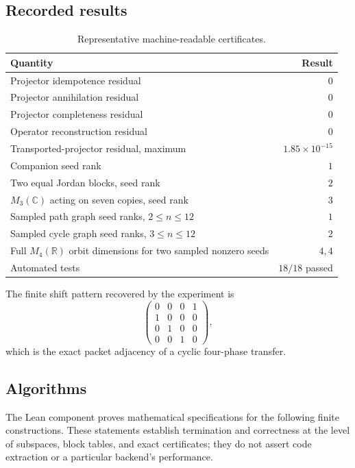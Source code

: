 \documentclass[11pt]{article}
\theoremstyle{definition}
\theoremstyle{remark}
\newcommand{\C}{\mathbb C}
\newcommand{\R}{\mathbb R}
\begin{document}
\subsection{Recorded results}

\begin{table}[htbp]
\centering
\caption{Representative machine-readable certificates.}
\label{tab:results}
\begin{tabular}{L{0.57\textwidth}r}
\toprule
Quantity & Result \\
\midrule
Projector idempotence residual & $0$ \\
Projector annihilation residual & $0$ \\
Projector completeness residual & $0$ \\
Operator reconstruction residual & $0$ \\
Transported-projector residual, maximum & $1.85\times10^{-15}$ \\
Companion seed rank & $1$ \\
Two equal Jordan blocks, seed rank & $2$ \\
$M_3(\C)$ acting on seven copies, seed rank & $3$ \\
Sampled path graph seed ranks, $2\le n\le12$ & $1$ \\
Sampled cycle graph seed ranks, $3\le n\le12$ & $2$ \\
Full $M_4(\R)$ orbit dimensions for two sampled nonzero seeds & $4,4$ \\
Automated tests & $18/18$ passed \\
\bottomrule
\end{tabular}
\end{table}

The finite shift pattern recovered by the experiment is
\[
\begin{pmatrix}
0&0&0&1\\
1&0&0&0\\
0&1&0&0\\
0&0&1&0
\end{pmatrix},
\]
which is the exact packet adjacency of a cyclic four-phase transfer.

\subsection{Algorithms}

The Lean component proves mathematical specifications for the following
finite constructions.  These statements establish termination and
correctness at the level of subspaces, block tables, and exact certificates;
they do not assert code extraction or a particular backend's performance.
\end{document}
